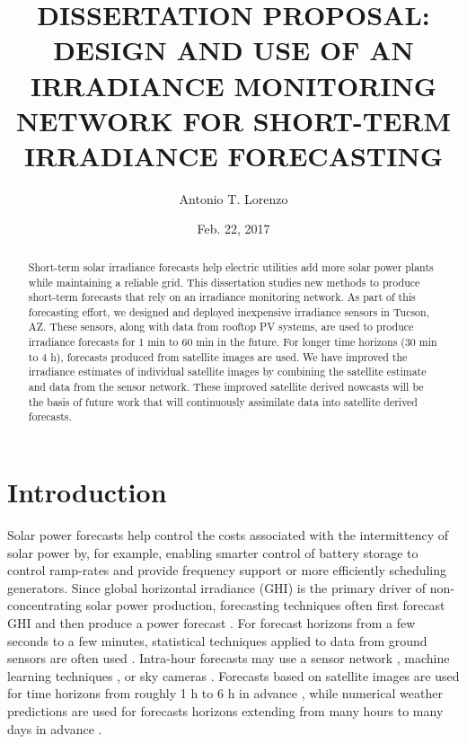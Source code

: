 \documentclass[12pt,letterpaper,notitlepage,openany]{article}
\begin{document}
\title{DISSERTATION PROPOSAL:\\ DESIGN AND USE OF AN IRRADIANCE
  MONITORING NETWORK FOR SHORT-TERM IRRADIANCE FORECASTING}
\author{Antonio T. Lorenzo}
\date{Feb. 22, 2017}
\maketitle

\begin{abstract}
  Short-term solar irradiance forecasts help electric utilities add
  more solar power plants while maintaining a reliable grid. This
  dissertation studies new methods to produce short-term forecasts
  that rely on an irradiance monitoring network. As part of this
  forecasting effort, we designed and deployed inexpensive irradiance
  sensors in Tucson, AZ. These sensors, along with data from rooftop
  PV systems, are used to produce irradiance forecasts for 1 min to 60
  min in the future. For longer time horizons (30 min to 4 h),
  forecasts produced from satellite images are used. We have improved
  the irradiance estimates of individual satellite images by combining
  the satellite estimate and data from the sensor network. These
  improved satellite derived nowcasts will be the basis of future work
  that will continuously assimilate data into satellite derived
  forecasts.
\end{abstract}

\section{Introduction}
Solar power forecasts help control the costs associated with the
intermittency of solar power \citep{Joskow2011} by, for example,
enabling smarter control of battery storage to control ramp-rates and
provide frequency support \citep{Hill2012,Cormode2015} or more
efficiently scheduling generators.
Since global horizontal irradiance (GHI) is the primary driver of
non-concentrating solar power production, forecasting techniques often
first forecast GHI and then produce a power forecast
\citep{Kleissl2013,Inman2013}.
For forecast horizons from a few seconds to a few minutes, statistical
techniques applied to data from ground sensors are often used
\citep{Yang2015,Lipperheide2015}.
Intra-hour forecasts may use a sensor network \citep{Lonij2013},
machine learning techniques \citep{Chu2013}, or sky cameras
\citep{Chow2011}.
Forecasts based on satellite images are used for time horizons from
roughly 1 h to 6 h in advance \citep{Perez2010}, while numerical
weather predictions are used for forecasts horizons extending from
many hours to many days in advance \citep{Perez2013}.
\end{document}
